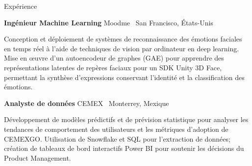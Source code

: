 \begin{rubric}{Expérience}

\entry*[09/2023 -- 01/2024]
  \textbf{Ingénieur Machine Learning} \hfill Moodme \textbar\ San Francisco, États-Unis
  \par
Conception et déploiement de systèmes de reconnaissance des émotions faciales en temps réel à l'aide de techniques de vision par ordinateur en deep learning.
Mise en œuvre d’un autoencodeur de graphes (GAE) pour apprendre des représentations latentes de repères faciaux pour un SDK Unity 3D Face, permettant la synthèse d’expressions conservant l’identité et la classification des émotions.


\entry*[02/2023 -- 08/2023]
  \textbf{Analyste de données} \hfill CEMEX \textbar\ Monterrey, Mexique
  \par
Développement de modèles prédictifs et de prévision statistique pour analyser les tendances de comportement des utilisateurs et les métriques d’adoption de CEMEXGO.
Utilisation de Snowflake et SQL pour l’extraction de données; création de tableaux de bord interactifs Power BI pour soutenir les décisions du Product Management.
\end{rubric}

